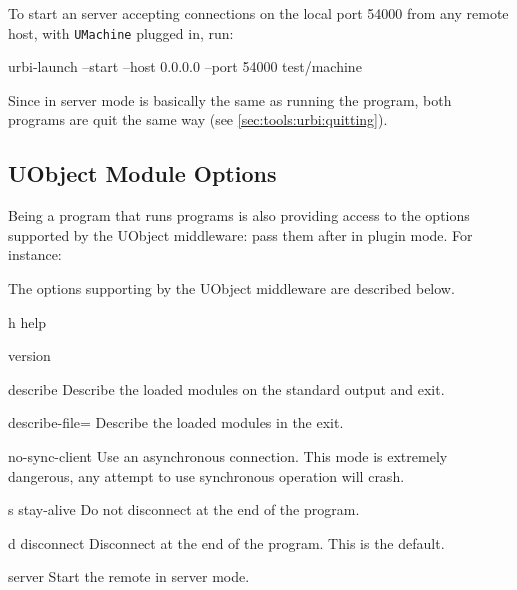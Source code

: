 To start an \urbi server accepting connections on the local port 54000
from any remote host, with \lstinline|UMachine| plugged in, run:

\begin{shell}
urbi-launch --start --host 0.0.0.0 --port 54000 test/machine
\end{shell}

Since  in server mode is basically the same as running
the  program, both programs are quit the same way (see
\autoref{sec:tools:urbi:quitting}).

\subsection{UObject Module Options}
\label{sec:tools:urbi-launch:uobject}

Being a program that runs programs  is also providing
access to the options supported by the UObject middleware: pass them after
\option{--} in plugin mode.  For instance:


The options supporting by the UObject middleware are described below.

\begin{options}
\item[h]{help} \optionHelp
\item{version} \optionVersion
\item{describe} Describe the loaded modules on the standard output and exit.
\item{describe-file=} Describe the loaded modules in the
   exit.
\item{no-sync-client} Use an asynchronous connection.  This mode is
  extremely dangerous, any attempt to use synchronous operation will crash.
\item[s]{stay-alive} Do not disconnect at the end of the program.
\item[d]{disconnect} Disconnect at the end of the program.   This is
  the default.
\item{server} Start the remote in server mode.
\end{options}

